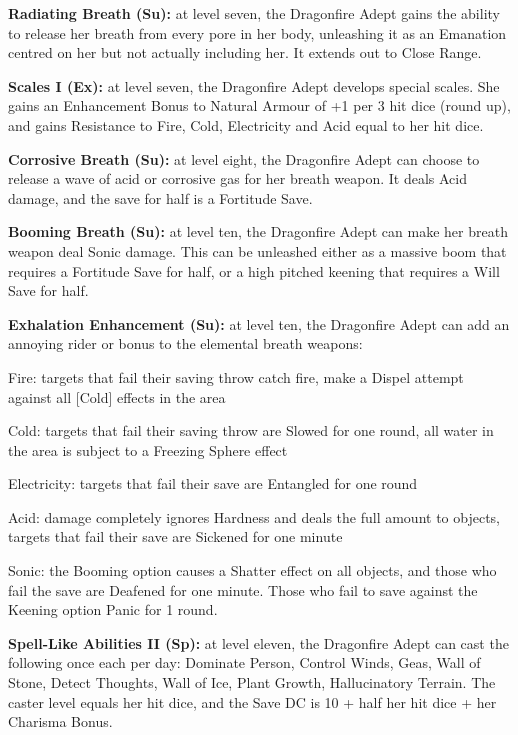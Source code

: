 \textbf{Radiating Breath (Su):} at level seven, the Dragonfire Adept gains the ability to release her breath from every pore in her body, unleashing it as an Emanation centred on her but not actually including her. It extends out to Close Range. 

\textbf{Scales I (Ex):} at level seven, the Dragonfire Adept develops special scales. She gains an Enhancement Bonus to Natural Armour of +1 per 3 hit dice (round up), and gains Resistance to Fire, Cold, Electricity and Acid equal to her hit dice. 

\textbf{Corrosive Breath (Su):} at level eight, the Dragonfire Adept can choose to release a wave of acid or corrosive gas for her breath weapon. It deals Acid damage, and the save for half is a Fortitude Save. 

\textbf{Booming Breath (Su):} at level ten, the Dragonfire Adept can make her breath weapon deal Sonic damage. This can be unleashed either as a massive boom that requires a Fortitude Save for half, or a high pitched keening that requires a Will Save for half. 

\textbf{Exhalation Enhancement (Su):} at level ten, the Dragonfire Adept can add an annoying rider or bonus to the elemental breath weapons:

\begin{itemize*}
\item Fire: targets that fail their saving throw catch fire, make a Dispel attempt against all [Cold] effects in the area 
\item Cold: targets that fail their saving throw are Slowed for one round, all water in the area is subject to a Freezing Sphere effect 
\item Electricity: targets that fail their save are Entangled for one round 
\item Acid: damage completely ignores Hardness and deals the full amount to objects, targets that fail their save are Sickened for one minute 
\item Sonic: the Booming option causes a Shatter effect on all objects, and those who fail the save are Deafened for one minute. Those who fail to save against the Keening option Panic for 1 round.
\end{itemize*}

\textbf{Spell-Like Abilities II (Sp):} at level eleven, the Dragonfire Adept can cast the following once each per day: Dominate Person, Control Winds, Geas, Wall of Stone, Detect Thoughts, Wall of Ice, Plant Growth, Hallucinatory Terrain. The caster level equals her hit dice, and the Save DC is 10 + half her hit dice + her Charisma Bonus. 

